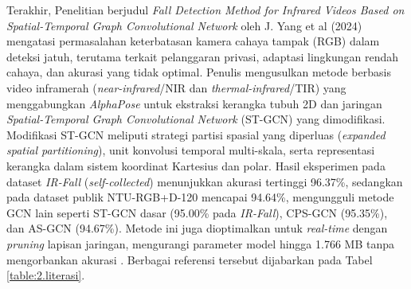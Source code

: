 Terakhir, Penelitian berjudul \textit{Fall Detection Method for Infrared Videos Based on Spatial-Temporal Graph Convolutional Network} oleh J. Yang et al (2024) mengatasi permasalahan keterbatasan kamera cahaya tampak (RGB) dalam deteksi jatuh, terutama terkait pelanggaran privasi, adaptasi lingkungan rendah cahaya, dan akurasi yang tidak optimal. Penulis mengusulkan metode berbasis video inframerah (\textit{near-infrared}/NIR dan \textit{thermal-infrared}/TIR) yang menggabungkan \textit{AlphaPose} untuk ekstraksi kerangka tubuh 2D dan jaringan \textit{Spatial-Temporal Graph Convolutional Network} (ST-GCN) yang dimodifikasi. Modifikasi ST-GCN meliputi strategi partisi spasial yang diperluas (\textit{expanded spatial partitioning}), unit konvolusi temporal multi-skala, serta representasi kerangka dalam sistem koordinat Kartesius dan polar. Hasil eksperimen pada dataset \textit{IR-Fall} (\textit{self-collected}) menunjukkan akurasi tertinggi 96.37\%, sedangkan pada dataset publik NTU-RGB+D-120 mencapai 94.64\%, mengungguli metode GCN lain seperti ST-GCN dasar (95.00\% pada \textit{IR-Fall}), CPS-GCN (95.35\%), dan AS-GCN (94.67\%). Metode ini juga dioptimalkan untuk \textit{real-time} dengan \textit{pruning} lapisan jaringan, mengurangi parameter model hingga 1.766 MB tanpa mengorbankan akurasi \cite{Yang2024}. Berbagai referensi tersebut dijabarkan pada Tabel \ref{table:2.literasi}. \par

